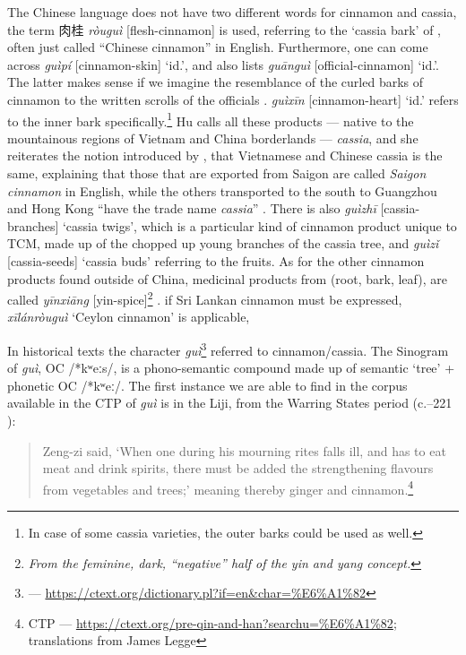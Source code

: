 The Chinese language does not have two different words for cinnamon and cassia, the term 肉桂 \textit{ròuguì} [flesh-cinnamon] is used, referring to the `cassia bark' of , often just called ``Chinese cinnamon'' in English. Furthermore, one can come across  \textit{guìpí} [cinnamon-skin] `id.', and \textcite[399]{hu_food_2005} also lists  \textit{guānguì} [official-cinnamon] `id.'. The latter makes sense if we imagine the resemblance of the curled barks of cinnamon to the written scrolls of the officials \parencite[see][732]{zhang_dictionary_2015}.  \textit{guìxīn} [cinnamon-heart] `id.' refers to the inner bark specifically.\footnote{In case of some cassia varieties, the outer barks could be used as well.} Hu calls all these products --- native to the mountainous regions of Vietnam and China borderlands --- \textit{cassia}, and she reiterates the notion introduced by \parencite{ravindran_cinnamon_2004}, that Vietnamese and Chinese cassia is the same, explaining that those that are exported from Saigon are called \textit{Saigon cinnamon} in English, while the others transported to the south to Guangzhou and Hong Kong ``have the trade name \textit{cassia}'' \parencite[400]{hu_food_2005}. There is also  \textit{guìzhī} [cassia-branches] `cassia twigs', which is a particular kind of cinnamon product unique to \gls{TCM}, made up of the chopped up young branches of the cassia tree, and  \textit{guìzǐ} [cassia-seeds] `cassia buds' referring to the fruits. As for the other cinnamon products found outside of China, medicinal products from  (root, bark, leaf), are called  \textit{yīnxiāng} [yin-spice]\footnote{\textit{From the feminine, dark, ``negative'' half of the yin and yang concept.}} \parencite[179]{hu_enumeration_1999}.
if Sri Lankan cinnamon must be expressed,  \textit{xīlánròuguì} `Ceylon cinnamon' is applicable, 

In historical texts the character  \textit{guì}\footnote{ --- \url{https://ctext.org/dictionary.pl?if=en&char=\%E6\%A1\%82}} referred to cinnamon/cassia. The Sinogram of \textit{guì}, \gls{OC} /*kʷeːs/, is a phono-semantic compound made up of semantic  `tree' + phonetic  \gls{OC} /*kʷeː/.
The first instance we are able to find in the corpus available in the \gls{CTP} of \textit{guì} is in the \gls{Liji}, from the Warring States period (c.--221 \BC{}):

\begin{quote}
    Zeng-zi said, `When one during his mourning rites falls ill, and has to eat meat and drink spirits, there must be added the strengthening flavours from vegetables and trees;' meaning thereby ginger and cinnamon.\footnote{\gls{CTP} --- \url{https://ctext.org/pre-qin-and-han?searchu=\%E6\%A1\%82}; translations from James Legge}
\end{quote}

